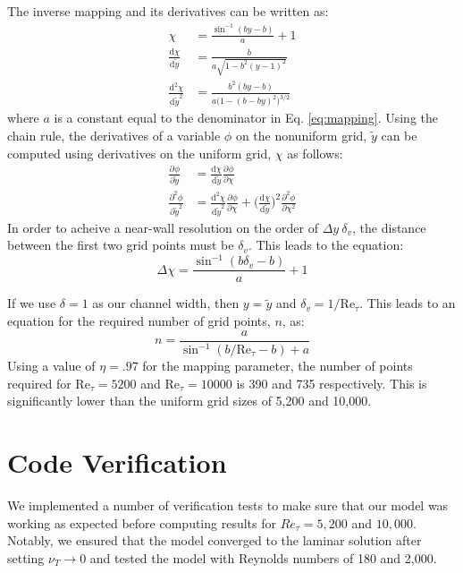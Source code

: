 \documentclass[a4paper,11pt]{article}
\newcommand{\pderiv}[3][]{%
  \ensuremath{\frac{\partial^{#1} {#2}}{\partial {#3}^{#1}}}}
\begin{document}
The inverse mapping and its derivatives can be written as:
\begin{align}
  \chi &= \frac{\sin^{-1}(by-b)}{a} + 1 \\
  \frac{\mathrm{d}\chi}{\mathrm{d}\tilde{y}} &= \frac{b}{a \sqrt{1-b^2(y-1)^2}} \label{eq:chi-y-1} \\
  \frac{\mathrm{d}^2\chi}{\mathrm{d}\tilde{y}^2} &= \frac{b^2(by-b)}{a\big(1-(b-by)^2\big)^{3/2}} \label{eq:chi-y-2}
\end{align}
where $a$ is a constant equal to the denominator in Eq. \ref{eq:mapping}.  Using the chain rule, the derivatives of a variable $\phi$ on the nonuniform grid, $\tilde{y}$ can be computed using derivatives on the uniform grid, $\chi$ as follows:
\begin{align}
 \pderiv{\phi}{\tilde{y}} &= \frac{\mathrm{d}\chi}{\mathrm{d}\tilde{y}} \pderiv{\phi}{\chi} \label{eq:phi-y-1} \\
 \pderiv[2]{\phi}{\tilde{y}} &= \frac{\mathrm{d}^2\chi}{\mathrm{d}\tilde{y}^2} \pderiv{\phi}{\chi} + \Big(\frac{\mathrm{d}\chi}{\mathrm{d}\tilde{y}} \Big)^2 \pderiv[2]{\phi}{\chi}  \label{eq:phi-y-2} 
\end{align}
In order to acheive a near-wall resolution on the order of $\Delta y ~ \delta_v$, the distance between the first two grid points must be $\delta_v$.  This leads to the equation:
\begin{equation}
 \Delta \chi = \frac{\sin^{-1}(b\delta_v -b)}{a}+1
\end{equation}

If we use $\delta = 1$ as our channel width, then $y = \tilde{y}$ and $\delta_v = 1/\mathrm{Re}_{\tau}$.  This leads to an equation for the required number of grid points, $n$, as:
\begin{equation}
 n = \frac{a}{\sin^{-1}(b/\mathrm{Re}_{\tau}-b)+a}
\end{equation}
Using a value of $\eta = .97$ for the mapping parameter, the number of points required for $\mathrm{Re}_{\tau}=5200$ and $\mathrm{Re}_{\tau}=10000$ is 390 and 735 respectively. This is significantly lower than the uniform grid sizes of 5,200 and 10,000.


\section{Code Verification}

We implemented a number of verification tests to make sure that our model was
working as expected before computing results for $Re_\tau = 5,200$ and
$10,000$. Notably, we ensured that the model converged to the laminar solution
after setting $\nu_T \rightarrow 0$ and tested the model with Reynolds numbers
of 180 and 2,000. 
\end{document}

